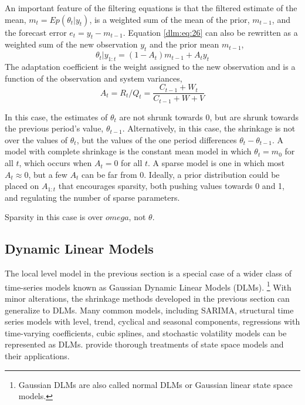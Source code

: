 An important feature of the filtering equations is that the filtered estimate of the mean, $m_{t} = E p(\theta_{t} | y_{t})$, is a weighted sum of the mean of the prior,  $m_{t - 1}$, and the forecast error $e_{t} = y_{t} - m_{t - 1}$.
Equation \eqref{dlm:eq:26} can also be rewritten as a weighted sum of the new observation $y_{t}$ and the prior mean $m_{t-1}$,
\begin{equation}
  \label{dlm:eq:18}
  \theta_{t} | y_{1:t} = (1 - A_{t}) m_{t-1} + A_{t} y_{t}
\end{equation}
The adaptation coefficient is the weight assigned to the new observation and is a function of the observation and system variances,
\begin{equation}
  \label{dlm:eq:24}
  A_{t} = R_{t} / Q_{t} = \frac{C_{t-1} + W_{t}}{C_{t-1} + W + V}
\end{equation}


In this case, the estimates of $\theta_{t}$ are not shrunk towards 0, but are shrunk towards the previous period's value, $\theta_{t-1}$.
Alternatively, in this case, the shrinkage is not over the values of $\theta_{t}$, but the values of the one period differences $\theta_{t} - \theta_{t -1}$.
A model with complete shrinkage is the constant mean model in which $\theta_{t} = m_{0}$ for all $t$, which occurs when $A_{t} = 0$ for all $t$.
A sparse model is one in which most $A_{t} \approx 0$, but a few $A_{t}$ can be far from 0.
Ideally, a prior distribution could be placed on $A_{1:t}$ that encourages sparsity, both pushing values towards 0 and 1, and regulating the number of sparse parameters.

Sparsity in this case is over $omega$, not $\theta$.

\subsection{Dynamic Linear Models}
\label{dlm:sec:dynam-line-models}

The local level model in the previous section is a special case of a wider class of time-series models known as Gaussian Dynamic Linear Models (DLMs).%
\footnote{Gaussian DLMs are also called normal DLMs or Gaussian linear state space models.}
With minor alterations, the shrinkage methods developed in the previous section can generalize to DLMs.
Many common models, including SARIMA, structural time series models with level, trend, cyclical and seasonal components, regressions with time-varying coefficients, cubic splines, and stochastic volatility models can be represented as DLMs. 
\textcites{WestHarrison1997}{DurbinKoopman2001}{CommandeurKoopman2007}{PetrisPetroneEtAl2009}{ShumwayStoffer2010} provide thorough treatments of state space models and their applications.

